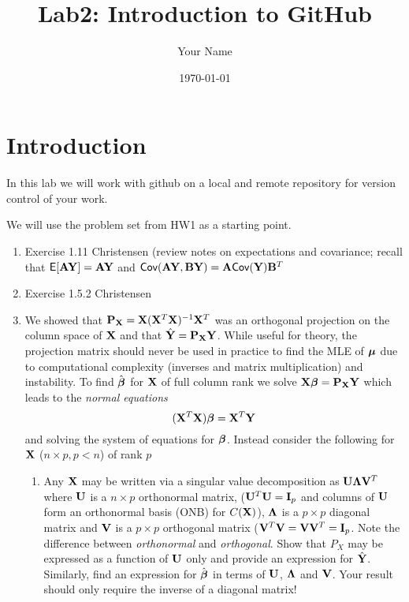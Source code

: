 \documentclass{article}\usepackage[]{graphicx}\usepackage[]{color}
\begin{document}
\title{Lab2: Introduction to GitHub}
\author{Your Name}
\date{\today}
\maketitle

\section*{Introduction}

In this lab we will work with github on a local and remote repository for version control of your work.

We will use the problem set from HW1 as a starting point.

\begin{enumerate}
  \item  Exercise 1.11 Christensen (review notes on expectations and covariance;  recall that
$\textsf{E}[\mathbf{A} \mathbf{Y}] = \mathbf{A} \mathbf{Y}$ and $\textsf{Cov}(\mathbf{A}\mathbf{Y}, \mathbf{B}\mathbf{Y}) = \mathbf{A} \textsf{Cov}(\mathbf{Y})\mathbf{B}^T$
\gap

\item Exercise 1.5.2 Christensen
\gap

\item  We showed that $\mathbf{P}_{\mathbf{X}} = \mathbf{X}(\mathbf{X}^T\mathbf{X})^{-1}\mathbf{X}^T$ was an orthogonal
  projection on the column space of $\mathbf{X}$ and that $\hat{\mathbf{Y}} = \mathbf{P}_{\mathbf{X}} \mathbf{Y}$.
  While useful for theory, the projection matrix should never be used
  in practice to find the MLE of $\boldsymbol{\mu}$ due to computational
  complexity (inverses and matrix multiplication) and instability.  To
  find $\hat{\boldsymbol{\beta}}$ for $\mathbf{X}$ of full column rank  we solve
  $\mathbf{X} \boldsymbol{\beta} = \mathbf{P}_{\mathbf{X}} \mathbf{Y}$ which
  leads to the {\em normal equations}
  $$(\mathbf{X}^T\mathbf{X}) \boldsymbol{\beta} = \mathbf{X}^T\mathbf{Y}$$
  and
  solving the system of equations for $\boldsymbol{\beta}$.
  Instead consider the following for $\mathbf{X}$ ($n \times p, p < n$) of rank $p$
  \begin{enumerate}
  \item  Any $\mathbf{X}$ may be written via a singular value decomposition as
    $\mathbf{U} \boldsymbol{\Lambda} \mathbf{V}^T$ where $\mathbf{U}$ is a $n \times p$ orthonormal matrix,
    ($\mathbf{U}^T\mathbf{U} = \mathbf{I}_p$ and columns of $\mathbf{U}$ form an orthonormal basis (ONB) for
    $C(\mathbf{X})$), $\boldsymbol{\Lambda}$ is a $p \times p$ diagonal matrix and $\mathbf{V}$ is
    a $p \times p$ orthogonal matrix ($\mathbf{V}^T\mathbf{V} = \mathbf{V} \mathbf{V}^T = \mathbf{I}_p$. Note
    the difference between {\em orthonormal} and {\em orthogonal}.
    Show that $P_X$ may be expressed as a function of $\mathbf{U}$ only and
    provide an expression for $\hat{\mathbf{Y}}$.  Similarly, find an
    expression for $\hat{\boldsymbol{\beta}}$ in terms of $\mathbf{U}$, $\boldsymbol{\Lambda}$ and $\mathbf{V}$.
    Your result should only require the inverse of a diagonal matrix!
    \gap


\end{enumerate}
\end{enumerate}
\end{document}
